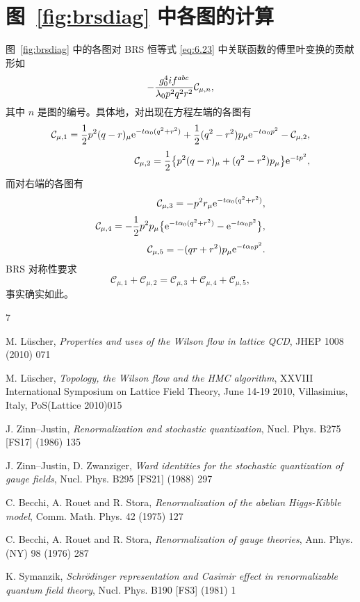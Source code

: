 \section{图~\ref{fig:brsdiag} 中各图的计算}\label{app:C}

图~\ref{fig:brsdiag} 中的各图对 BRS 恒等式 \eqref{eq:6.23}
中关联函数的傅里叶变换的贡献形如
\begin{equation}
   -{g_0^4if^{abc}\over \lambda_0 p^2q^2r^2}\mathcal{C}_{\mu,n},
   \label{eq:C.1}
\end{equation}
其中 $n$ 是图的编号。具体地，对出现在方程左端的各图有
\begin{align}
   \mathcal{C}_{\mu,1}=
   \frac{1}{2}p^2(q-r)_{\mu}\mathrm{e}^{-t\alpha_0(q^2+r^2)}+
   \frac{1}{2}(q^2-r^2)p_{\mu}\mathrm{e}^{-t\alpha_0p^2}
   -\mathcal{C}_{\mu,2},
   \label{eq:C.2}\\[3pt]
   \mathcal{C}_{\mu,2}=
   \frac{1}{2}\bigl\{p^2(q-r)_{\mu}+(q^2-r^2)p_{\mu}\bigr\}\mathrm{e}^{-tp^2},
   \label{eq:C.3}
\end{align}
而对右端的各图有
\begin{align}
   \mathcal{C}_{\mu,3}=-p^2r_{\mu}\mathrm{e}^{-t\alpha_0(q^2+r^2)},
   \label{eq:C.4}\\[3pt]
   \mathcal{C}_{\mu,4}=-\frac{1}{2}p^2p_{\mu}\bigl\{
   \mathrm{e}^{-t\alpha_0(q^2+r^2)}-\mathrm{e}^{-t\alpha_0p^2}\bigr\},
   \label{eq:C.5}\\[3pt]
   \mathcal{C}_{\mu,5}=-(qr+r^2)p_{\mu}\mathrm{e}^{-t\alpha_0p^2}.
   \label{eq:C.6}
\end{align}
BRS 对称性要求
\begin{equation}
   \mathcal{C}_{\mu,1}+\mathcal{C}_{\mu,2}=
   \mathcal{C}_{\mu,3}+\mathcal{C}_{\mu,4}+\mathcal{C}_{\mu,5},
   \label{eq:C.7}
\end{equation}
事实确实如此。

\begin{thebibliography}{7}

M. L\"uscher,
{\itshape Properties and uses of the Wilson flow in lattice QCD},
JHEP 1008 (2010) 071

M. L\"uscher,
{\itshape Topology, the Wilson flow and the HMC algorithm},
XXVIII International Symposium on Lattice Field Theory, June 14-19 2010, Villasimius, Italy,
PoS(Lattice 2010)015

J. Zinn--Justin,
{\itshape Renormalization and stochastic quantization},
Nucl. Phys. B275 [FS17] (1986) 135

J. Zinn--Justin, D. Zwanziger,
{\itshape Ward identities for the stochastic quantization of gauge fields},
Nucl. Phys. B295 [FS21] (1988) 297

C. Becchi, A. Rouet and R. Stora,
{\itshape Renormalization of the abelian Higgs-Kibble model},
Comm. Math. Phys. 42 (1975) 127

C. Becchi, A. Rouet and R. Stora,
{\itshape Renormalization of gauge theories},
Ann. Phys. (NY) 98 (1976) 287

K. Symanzik,
{\itshape Schr\"odinger representation and Casimir effect in
renormalizable quantum field theory},
Nucl. Phys. B190 [FS3] (1981) 1

\end{thebibliography}
